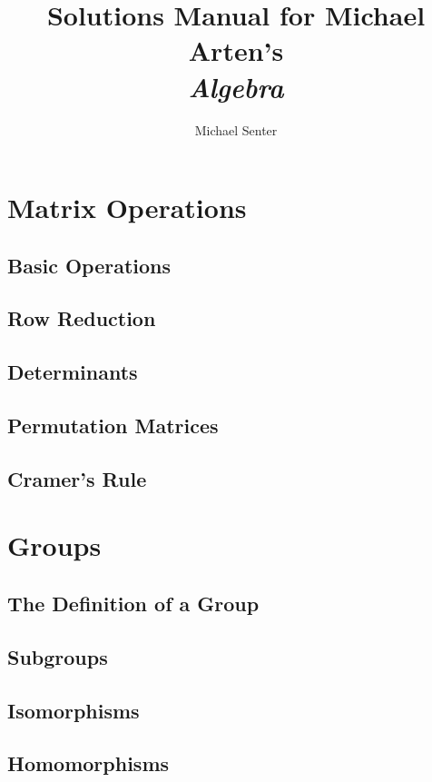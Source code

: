 \documentclass[12pt]{book}
\begin{document}
\title{Solutions Manual for Michael Arten's \\ \emph{Algebra}}%
\author{Michael Senter}

\maketitle


\chapter{Matrix Operations}

\section{Basic Operations}
\section{Row Reduction}
\section{Determinants}
\section{Permutation Matrices}
\section{Cramer's Rule}




\chapter{Groups}

\section{The Definition of a Group}
\section{Subgroups}
\section{Isomorphisms}
\section{Homomorphisms}
\end{document}
